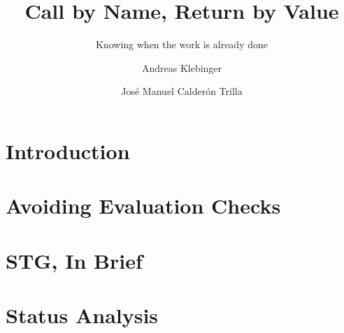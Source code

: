 \documentclass[acmsmall,review,anonymous]{acmart}\settopmatter{printfolios=true,printccs=false,printacmref=false}
\begin{document}
\title[Return By Value]{Call by Name, Return by Value}         %
\subtitle{Knowing when the work is already done}                     %


\author{Andreas Klebinger}

\author{Jos\'{e} Manuel Calder\'{o}n Trilla}


\begin{abstract}

\end{abstract}


\maketitle

\section{Introduction}
\label{sec:intro}


\section{Avoiding Evaluation Checks}
\label{sec:optimization}


\section{STG, In Brief}
\label{sec:stg}


\section{Status Analysis}
\label{sec:analysis}

\end{document}

